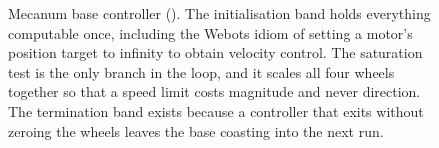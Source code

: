 \begin{figure}[!t]
\caption{Mecanum base controller (\phaseA{}). The initialisation band
holds everything computable once, including the Webots idiom of setting
a motor's position target to infinity to obtain velocity control. The
saturation test is the only branch in the loop, and it scales all four
wheels together so that a speed limit costs magnitude and never
direction. The termination band exists because a controller that exits
without zeroing the wheels leaves the base coasting into the next run.}
\label{fig:flow_base}
\end{figure}
